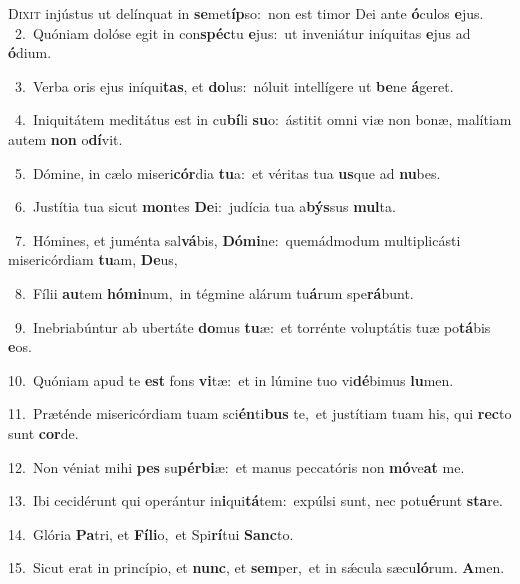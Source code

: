 \lettrine{\initial\textcolor{\initialcolor}{D}}{ixit} injústus ut delínquat in \textbf{se}\-met\-\textbf{íp}\-so:~\star non est timor Dei ante \textbf{ó}\-culos \textbf{e}\-jus.\\
{\numbfont\textcolor{\numbcolor}{~2.}}~Quóniam dolóse egit in con\-\textbf{spéc}\-tu \textbf{e}\-jus:~\star ut inveniátur iníquitas \textbf{e}\-jus ad \textbf{ó}\-dium.\par
{\numbfont\textcolor{\numbcolor}{~3.}}~Verba oris ejus iníqui\-\textbf{tas}\-, et \textbf{do}\-lus:~\star nóluit intellígere ut \textbf{be}\-ne \textbf{á}\-geret.\par
{\numbfont\textcolor{\numbcolor}{~4.}}~Iniquitátem meditátus est in cu\-\textbf{bí}\-li \textbf{su}\-o:~\star ástitit omni viæ non bonæ, malítiam autem \textbf{non} o\-\textbf{dí}\-vit.\par
{\numbfont\textcolor{\numbcolor}{~5.}}~Dómine, in cælo miseri\-\textbf{cór}\-dia \textbf{tu}\-a:~\star et véritas tua \textbf{us}\-que ad \textbf{nu}\-bes.\par
{\numbfont\textcolor{\numbcolor}{~6.}}~Justítia tua sicut \textbf{mon}\-tes \textbf{De}\-i:~\star judícia tua a\-\textbf{býs}\-sus \textbf{mul}\-ta.\par
{\numbfont\textcolor{\numbcolor}{~7.}}~Hómines, et juménta sal\-\textbf{vá}\-bis, \textbf{Dó}\-\textbf{mi}ne:~\star quemádmodum multiplicásti misericórdiam \textbf{tu}\-am, \textbf{De}\-us,\par
{\numbfont\textcolor{\numbcolor}{~8.}}~Fílii \textbf{au}\-tem \textbf{hó}\-\textbf{mi}num,~\star in tégmine alárum tu\-\textbf{á}\-rum spe\-\textbf{rá}\-bunt.\par
{\numbfont\textcolor{\numbcolor}{~9.}}~Inebriabúntur ab ubertáte \textbf{do}\-mus \textbf{tu}\-æ:~\star et torrénte voluptátis tuæ po\-\textbf{tá}\-bis \textbf{e}\-os.\par
{\numbfont\textcolor{\numbcolor}{10.}}~Quóniam apud te \textbf{est} fons \textbf{vi}\-tæ:~\star et in lúmine tuo vi\-\textbf{dé}\-bimus \textbf{lu}\-men.\par
{\numbfont\textcolor{\numbcolor}{11.}}~Præténde misericórdiam tuam sci\-\textbf{én}\-ti\textbf{bus} te,~\star et justítiam tuam his, qui \textbf{rec}\-to sunt \textbf{cor}\-de.\par
{\numbfont\textcolor{\numbcolor}{12.}}~Non véniat mihi \textbf{pes} su\-\textbf{pér}\-\textbf{bi}æ:~\star et manus peccatóris non \textbf{mó}\-ve\textbf{at} me.\par
{\numbfont\textcolor{\numbcolor}{13.}}~Ibi cecidérunt qui operántur in\-\textbf{i}\-qui\-\textbf{tá}\-tem:~\star expúlsi sunt, nec potu\-\textbf{é}\-runt \textbf{sta}\-re.\par
{\numbfont\textcolor{\numbcolor}{14.}}~Glória \textbf{Pa}\-tri, et \textbf{Fí}\-\textbf{li}o,~\star et Spi\-\textbf{rí}\-tui \textbf{Sanc}\-to.\par
{\numbfont\textcolor{\numbcolor}{15.}}~Sicut erat in princípio, et \textbf{nunc}\-, et \textbf{sem}\-per,~\star et in sǽcula sæcu\-\textbf{ló}\-rum. \textbf{A}\-men.\par

